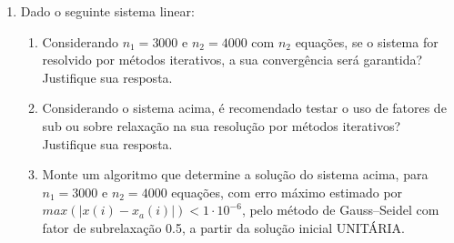 \documentclass[12pt]{article}
\newenvironment{smallitem}{
    \vspace{-2mm}
    \begin{enumerate}
    \setlength{\parskip}{0pt}
    \setlength{\itemsep}{2pt}
}{
    \vspace{-2mm}
    \end{enumerate}
}
\begin{document}
\begin{enumerate}[label=\textbf{\arabic*})]
\begin{smallitem}
\item Determine o resíduo máximo do sistema acima com a solução $x$ obtida e
avalie se este resíduo é satisfatório (de acordo com o número de dígitos
significativos que usar);

\item Monte um algoritmo \verb!x = fsubstituicoesf(n, A)!, que determine e
retorne a solução $x$ do sistema $A_0 \cdot x = b$, a partir das entradas $n$ e
$A$ ($L \cdot U = A_0$ e $A = \begin{bmatrix} L $\textbackslash$ U & b
\end{bmatrix}$, matriz expandida que contém $L$ e $U$ (sobrepostas) e
concatenadas com $b$ em $n$ linhas e $n + 1$ colunas), resolvendo as duas
substituições $L \cdot c = b$ e $U \cdot x = c$;

\item Monte um algoritmo \verb!LU = fLU(n, A)!, que determine e retorne a matriz
expandida decomposta $LU$, com as matrizes $L$ e $U$ (sobrepostas) e
concatenadas com $b$, $LU = \begin{bmatrix} L $\textbackslash$ U & b
\end{bmatrix}$, com pivotação parcial interna, através da função
\verb!A = fpivotacao(n, A, k)! - que determina a matriz expandida $A$ com linha
$k$ com o maior coeficiente em módulo na coluna $k$, onde
$A = \begin{bmatrix} A_0 & b \end{bmatrix}$ e $A_0 \cdot x = b$.

\end{smallitem}

\item Dado o seguinte sistema linear:

\begin{smallitem}

\item Considerando $n_1 = 3000$ e $n_2 = 4000$ com $n_2$ equações, se o sistema
for resolvido por métodos iterativos, a sua convergência será garantida?
Justifique sua resposta.

\item Considerando o sistema acima, é recomendado testar o uso de fatores de sub
ou sobre relaxação na sua resolução por métodos iterativos? Justifique sua
resposta.

\item Monte um algoritmo que determine a solução do sistema acima, para $n_1 =
3000$ e $n_2 = 4000$ equações, com erro máximo estimado por $max(\vert x(i) -
x_a(i) \vert) < 1 \cdot 10^{-6}$, pelo método de Gauss--Seidel com fator de
subrelaxação 0.5, a partir da solução inicial UNITÁRIA.


\end{smallitem}
\end{enumerate}
\end{document}
